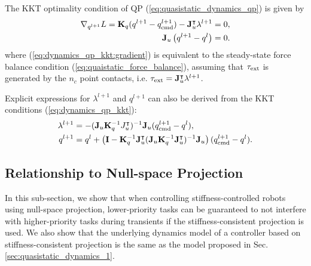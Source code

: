 The KKT optimality condition of QP (\ref{eq:quasistatic_dynamics_qp}) is given by
\begin{subequations}

\label{eq:dynamics_qp_kkt}
\begin{align}
\nabla_{q^{l+1}}L = \mb{K}_q (q^{l+1} - \qcmd[l+1]) - \J_u^\intercal \lambda^{l+1} &= 0, \label{eq:dynamics_qp_kkt:gradient} \\
  \J_u \left(q^{l+1} - q^l\right) &= 0. \label{eq:dynamics_qp_kkt:equality_constraint}
\end{align}
\end{subequations}
where (\ref{eq:dynamics_qp_kkt:gradient}) is equivalent to the steady-state force balance condition (\ref{eq:quaistatic_force_balance}), assuming that $\tauE$ is generated by the $n_c$ point contacts, i.e. $\tauE = \J_u^\intercal \lambda^{l+1}$.

Explicit expressions for $\lambda^{l+1}$ and $q^{l+1}$ can also be derived from the KKT conditions (\ref{eq:dynamics_qp_kkt}):
\begin{subequations}

\label{eq:explicit_force_and_state}
\begin{align}
\lambda^{l+1} &= -(\J_u \mb{K}_q^{-1} J_u^\intercal)^{-1} \J_u (\qcmd[l+1] - q^l), \label{eq:explicit_force_and_state:force}\\
q^{l+1} &= q^l + \left(\mb{I} -  \mb{K}_q^{-1}\J_u^\intercal (\J_u \mb{K}_q^{-1} \J_u^\intercal)^{-1}\J_u \right) (\qcmd[l+1] - q^l). \label{eq:explicit_force_and_state:state}
\end{align}
\end{subequations}


\subsection{Relationship to Null-space Projection}
In this sub-section, we show that when controlling stiffness-controlled robots using null-space projection, lower-priority tasks can be guaranteed to not interfere with higher-priority tasks during transients if the stiffness-consistent projection \cite{dietrich2015overview} is used. We also show that the underlying dynamics model of a controller based on stiffness-consistent projection is the same as the model proposed in Sec. \ref{sec:quasistatic_dynamics_1}. 

